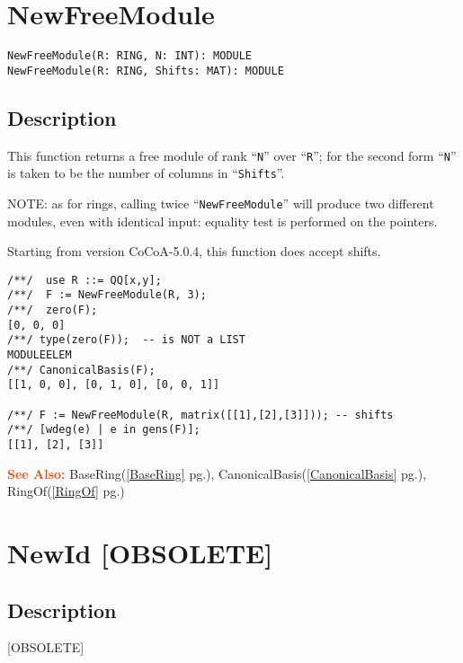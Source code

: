 \documentclass[a4paper]{mybook}
\newenvironment{command}{}{} %
\newcommand\SeeAlso{\par\textcolor{OrangeRed}{\textbf{\large See Also: }}}
\begin{document}
\section{NewFreeModule}
\label{NewFreeModule}
\begin{command} %


\begin{Verbatim}[label=syntax, rulecolor=\color{MidnightBlue},
frame=single]
NewFreeModule(R: RING, N: INT): MODULE
NewFreeModule(R: RING, Shifts: MAT): MODULE
\end{Verbatim}


\subsection*{Description}

This function returns a free module of rank ``\verb&N&'' over ``\verb&R&''; for
the second form ``\verb&N&'' is taken to be the number of columns in ``\verb&Shifts&''.
\par 
NOTE: as for rings, calling twice ``\verb&NewFreeModule&'' will produce
two different modules, even with identical input: equality test is
performed on the pointers.
\par 
Starting from version CoCoA-5.0.4, this function does accept shifts.
\begin{Verbatim}[label=example, rulecolor=\color{PineGreen}, frame=single]
/**/  use R ::= QQ[x,y];
/**/  F := NewFreeModule(R, 3);
/**/  zero(F);
[0, 0, 0]
/**/ type(zero(F));  -- is NOT a LIST
MODULEELEM
/**/ CanonicalBasis(F);
[[1, 0, 0], [0, 1, 0], [0, 0, 1]]

/**/ F := NewFreeModule(R, matrix([[1],[2],[3]])); -- shifts
/**/ [wdeg(e) | e in gens(F)];
[[1], [2], [3]]
\end{Verbatim}


\SeeAlso %
  BaseRing(\ref{BaseRing} pg.\pageref{BaseRing}), 
    CanonicalBasis(\ref{CanonicalBasis} pg.\pageref{CanonicalBasis}), 
    RingOf(\ref{RingOf} pg.\pageref{RingOf})
\end{command} %

\section{NewId [OBSOLETE]}
\label{NewId [OBSOLETE]}
\begin{command} %



\subsection*{Description}

[OBSOLETE]

\end{command} %
\end{document}
